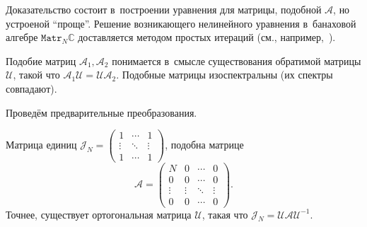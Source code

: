 Доказательство состоит в~построении уравнения для матрицы, подобной \( \mathscr{A} \),
 но устроеной ``проще''. Решение возникающего нелинейного уравнения
 в~банаховой алгебре \( \mathtt{Matr}_N\mathbb{C} \)
 доставляется методом простых итераций (см., например,~\cite{baskakov-harmonic}).

Подобие матриц \( \mathcal{A}_1, \mathcal{A}_2 \)
 понимается в~смысле существования обратимой матрицы \( \mathcal{U} \),
 такой что \( \mathcal{A}_1 \mathcal{U} = \mathcal{U} \mathcal{A}_2 \).
Подобные матрицы изоспектральны (их спектры совпадают).

Провед\"ем предварительные преобразования.

\begin{lem}
    Матрица единиц 
    \( \mathcal{J}_N =
    \begin{pmatrix}
        1 & \cdots & 1 \\
        \vdots & \ddots & \vdots \\ 
    1 & \cdots & 1 \end{pmatrix} \),
    подобна матрице
    \[
        \mathcal{A} = \begin{pmatrix}
            N & 0 & \cdots & 0 \\
            0 & 0 & \cdots & 0 \\
            \vdots & \vdots & \ddots & \vdots \\
            0 & 0 & \cdots & 0 \end{pmatrix}. \]
    Точнее, существует ортогональная матрица \( \mathcal{U} \),
    такая что
    \( \mathcal{J}_N = \mathcal{U}\mathcal{A} \mathcal{U}^{-1} \).
\end{lem}
